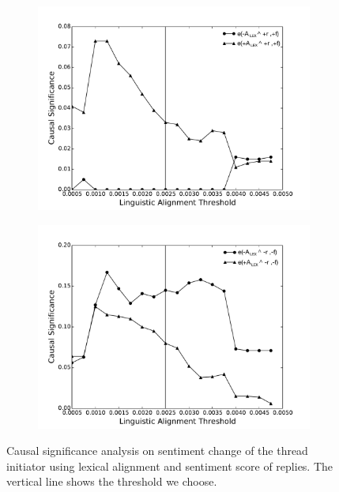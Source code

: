 \documentclass[man,biblatex,floatsintext]{apa6}
\begin{document}
\begin{figure}[!htb]
\begin{subfigure}{.5\textwidth}
  \centering
  \includegraphics[width=\linewidth]{Figures/EnlargeposF05Lex20_update.pdf}
  \caption{\label{fig:posf05Lex}}
\end{subfigure}
\begin{subfigure}{.5\textwidth}
  \centering
  \includegraphics[width=\linewidth]{Figures/EnlargenegF05Lex20_update.pdf}
  \caption{\label{fig:negf05Lex}}
\end{subfigure}
\caption{Causal significance analysis on sentiment change of the thread initiator using lexical alignment and sentiment score of replies. The vertical line shows the threshold we choose.}
\label{fig:Robust_Lex}
\end{figure}
\end{document}
